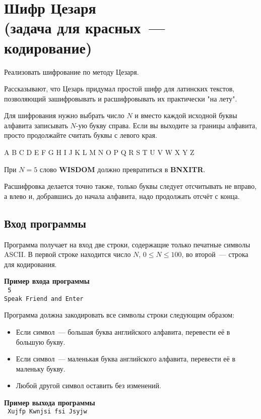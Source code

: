 \documentclass[a4paper,10pt]{article}
\begin{document}
\section*{Шифр Цезаря\\
(задача для красных~--- кодирование)}

Реализовать шифрование по методу Цезаря.

Рассказывают, что Цезарь придумал простой шифр для латинских текстов, позволяющий зашифровывать и расшифровывать их практически "на лету".

Для шифрования нужно выбрать число $N$ и вместо каждой исходной буквы алфавита записывать $N$-ую букву справа.
Если вы выходите за границы алфавита, просто продолжайте считать буквы с левого края.

\begin{center}
A B C D E F G H I J K L M N O P Q R S T U V W X Y Z
\end{center}

При $N = 5$ слово \textbf{WISDOM} должно превратиться в \textbf{BNXITR}.

Расшифровка делается точно также, только буквы следует отсчитывать не вправо, а влево и, добравшись до начала алфавита, надо продолжать отсчёт с конца.

\subsection*{Вход программы}

Программа получает на вход две строки, содержащие только печатные символы ASCII.
В первой строке находится число $N$, $0 \leq N \leq 100$, во второй~--- строка для кодирования.

\noindent\textbf{Пример входа программы}\\
\texttt{
5\\
Speak Friend and Enter
}

Программа должна закодировать все символы строки следующим образом:

\begin{itemize}
    \item Если символ~--- большая буква английского алфавита, перевести её в большую букву.
    \item Если символ~--- маленькая буква английского алфавита, перевести её в маленьку букву.
    \item Любой другой символ оставить без изменений.
\end{itemize}

\noindent\textbf{Пример выхода программы}\\
\texttt{
Xujfp Kwnjsi fsi Jsyjw
}
\end{document}
